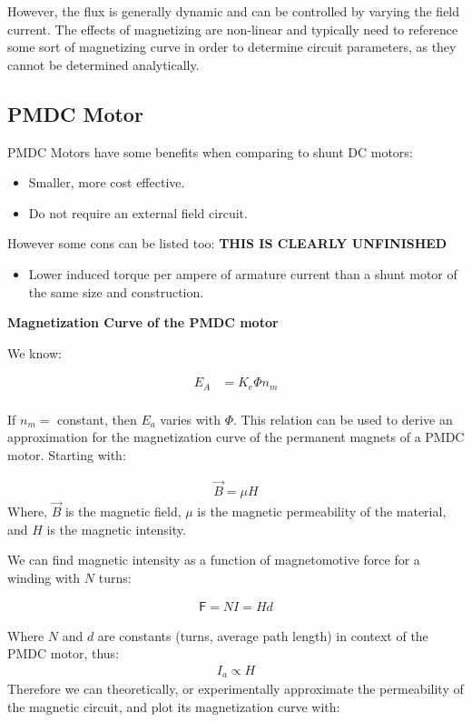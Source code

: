 \documentclass{book}
\begin{document}
However, the flux is generally dynamic and can be controlled by varying the field current. The effects of magnetizing are non-linear and typically need to reference some sort of magnetizing curve in order to determine circuit parameters, as they cannot be determined analytically.


\subsection{PMDC Motor}

PMDC Motors have some benefits when comparing to shunt DC motors:
\begin{itemize}
	\item Smaller, more cost effective.
	\item Do not require an external field circuit.
\end{itemize}

However some cons can be listed too: \textbf{THIS IS CLEARLY UNFINISHED}

\begin{itemize}
	\item Lower induced torque per ampere of armature current than a shunt motor of the same size and construction.
\end{itemize}

\newpage

\textbf{Magnetization Curve of the PMDC motor}

We know:

\begin{align*}
	E_A &= K_e \Phi n_m \\
\end{align*}

If $n_m = $ constant, then $E_a$ varies with $\Phi$. This relation can be used to derive an approximation for the magnetization curve of the permanent magnets of a PMDC motor. Starting with:

\begin{align*}
	\vec{B} = \mu H
\end{align*}
Where, $\vec{B}$ is the magnetic field, $\mu$ is the magnetic permeability of the material, and $H$ is the magnetic intensity.

We can find magnetic intensity as a function of magnetomotive force for a winding with $N$ turns:

\begin{align*}
	\mathsf{F} = NI = H d
\end{align*}

Where $N$ and $d$ are constants (turns, average path length) in context of the PMDC motor, thus:
\begin{align*}
	I_a \propto H
\end{align*}
Therefore we can theoretically, or experimentally approximate the permeability of the magnetic circuit, and  plot its magnetization curve with:
\end{document}
